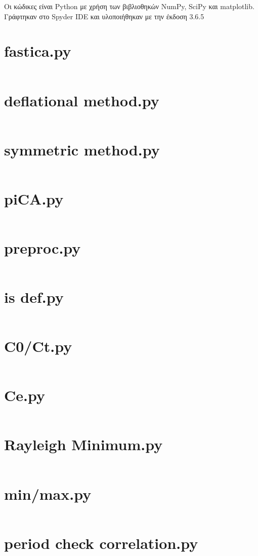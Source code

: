 Οι κώδικες είναι \en Python \gr με χρήση των βιβλιοθηκών \en NumPy\cite{python:30}, SciPy\cite{python:29} \gr και \en matplotlib\cite{python:31}. \gr Γράφτηκαν στο \en Spyder IDE \gr και υλοποιήθηκαν με την έκδοση 3.6.5
\en
\section{\en fastica.py}
\en
\inputminted[linenos,fontsize=\scriptsize]{python}{codes/fastica.py}
\newpage
\section{\en deflational method.py}
\en
\inputminted[linenos,fontsize=\scriptsize]{python}{codes/deflational_method.py}
\newpage
\section{\en symmetric method.py}
\en
\inputminted[linenos,fontsize=\scriptsize]{python}{codes/symmetric_method.py}
\newpage
\section{\en piCA.py}
\en
\inputminted[linenos,fontsize=\scriptsize]{python}{codes/piCA.py}
\newpage
\section{\en preproc.py}
\en
\inputminted[linenos,fontsize=\scriptsize]{python}{codes/preproc.py}
\newpage
\section{\en is def.py}
\en
\inputminted[linenos,fontsize=\scriptsize]{python}{codes/misc.py}
\newpage
\section{\en C0/Ct.py}
\en
\inputminted[linenos,fontsize=\scriptsize]{python}{codes/C0_Ct.py}
\newpage
\section{\en Ce.py}
\en
\inputminted[linenos,fontsize=\scriptsize]{python}{codes/C_e.py}
\newpage
\section{\en Rayleigh Minimum.py}
\en
\inputminted[linenos,fontsize=\scriptsize]{python}{codes/rayleigh_minimum.py}
\newpage
\section{\en min/max.py}
\en
\inputminted[linenos,fontsize=\scriptsize]{python}{codes/min_max.py}
\newpage
\section{\en period check correlation.py}
\en
\inputminted[linenos,fontsize=\scriptsize]{python}{codes/period_check_correlation.py}